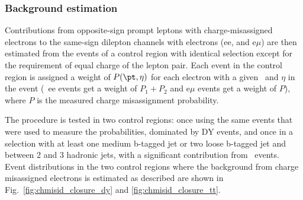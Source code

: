 \subsubsection{Background estimation}
Contributions from opposite-sign prompt leptons with charge-misassigned electrons to the same-sign dilepton channels with electrons (ee, and e$\mu$) are then estimated from the events of a control region with identical selection except for the requirement of equal charge of the lepton pair.
Each event in the control region is assigned a weight of $P(\pt,\eta)$ for each electron with a given \pt\ and $\eta$ in the event (\ie\ ee events get a weight of $P_1+P_2$ and e$\mu$ events get a weight of $P$), where $P$ is the measured charge misassignment probability.

The procedure is tested in two control regions: once using the same events that were used to measure the probabilities, dominated by DY events, and once in a selection with at least one medium b-tagged jet or two loose b-tagged jet and between 2 and 3 hadronic jets, with a significant contribution from \ttbar\ events.
Event distributions in the two control regions where the background from charge misassigned electrons is estimated as described are shown in Fig.~\ref{fig:chmisid_closure_dy} and \ref{fig:chmisid_closure_tt}.


